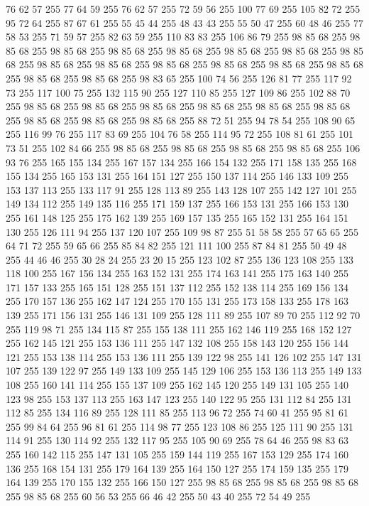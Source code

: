 76 62 57 255 77 64 59 255 76 62 57 255 72 59 56 255 100 77 69 255 105 82 72 255 95 72 64 255 87 67 61 255 55 45 44 255 48 43 43 255 55 50 47 255 60 48 46 255 77 58 53 255 71 59 57 255 82 63 59 255 110 83 83 255 106 86 79 255 98 85 68 255 98 85 68 255 98 85 68 255 98 85 68 255 98 85 68 255 98 85 68 255 98 85 68 255 98 85 68 255 98 85 68 255 98 85 68 255 98 85 68 255 98 85 68 255 98 85 68 255 98 85 68 255 98 85 68 255 98 85 68 255 98 83 65 255 100 74 56 255 126 81 77 255 117 92 73 255 117 100 75 255 132 115 90 255 127 110 85 255 127 109 86 255 102 88 70 255 98 85 68 255 98 85 68 255 98 85 68 255 98 85 68 255 98 85 68 255 98 85 68 255 98 85 68 255 98 85 68 255 98 85 68 255 88 72 51 255 94 78 54 255 108 90 65 255 116 99 76 255 117 83 69 255 104 76 58 255 114 95 72 255 108 81 61 255 101 73 51 255 102 84 66 255 98 85 68 255 98 85 68 255 98 85 68 255
98 85 68 255 106 93 76 255 165 155 134 255 167 157 134 255 166 154 132 255 171 158 135 255 168 155 134 255 165 153 131 255 164 151 127 255 150 137 114 255 146 133 109 255 153 137 113 255 133 117 91 255 128 113 89 255 143 128 107 255 142 127 101 255 149 134 112 255 149 135 116 255 171 159 137 255 166 153 131 255 166 153 130 255 161 148 125 255 175 162 139 255 169 157 135 255 165 152 131 255 164 151 130 255 126 111 94 255 137 120 107 255 109 98 87 255 51 58 58 255 57 65 65 255 64 71 72 255 59 65 66 255 85 84 82 255 121 111 100 255 87 84 81 255 50 49 48 255 44 46 46 255 30 28 24 255 23 20 15 255 123 102 87 255 136 123 108 255 133 118 100 255 167 156 134 255 163 152 131 255 174 163 141 255 175 163 140 255 171 157 133 255 165 151 128 255 151 137 112 255 152 138 114 255 169 156 134 255 170 157 136 255 162 147 124 255 170 155 131 255 173 158 133 255 178 163 139 255 171 156 131 255 146 131 109 255 128 111 89 255 107 89 70 255 112 92 70 255 119 98 71 255 134 115 87 255
155 138 111 255 162 146 119 255 168 152 127 255 162 145 121 255 153 136 111 255 147 132 108 255 158 143 120 255 156 144 121 255 153 138 114 255 153 136 111 255 139 122 98 255 141 126 102 255 147 131 107 255 139 122 97 255 149 133 109 255 145 129 106 255 153 136 113 255 149 133 108 255 160 141 114 255 155 137 109 255 162 145 120 255 149 131 105 255 140 123 98 255 153 137 113 255 163 147 123 255 140 122 95 255 131 112 84 255 131 112 85 255 134 116 89 255 128 111 85 255 113 96 72 255 74 60 41 255 95 81 61 255 99 84 64 255 96 81 61 255 114 98 77 255 123 108 86 255 125 111 90 255 131 114 91 255 130 114 92 255 132 117 95 255 105 90 69 255 78 64 46 255 98 83 63 255 160 142 115 255 147 131 105 255 159 144 119 255 167 153 129 255 174 160 136 255 168 154 131 255 179 164 139 255 164 150 127 255 174 159 135 255 179 164 139 255 170 155 132 255 166 150 127 255 98 85 68 255 98 85 68 255 98 85 68 255 98 85 68 255 60 56 53 255 66 46 42 255 50 43 40 255 72 54 49 255
